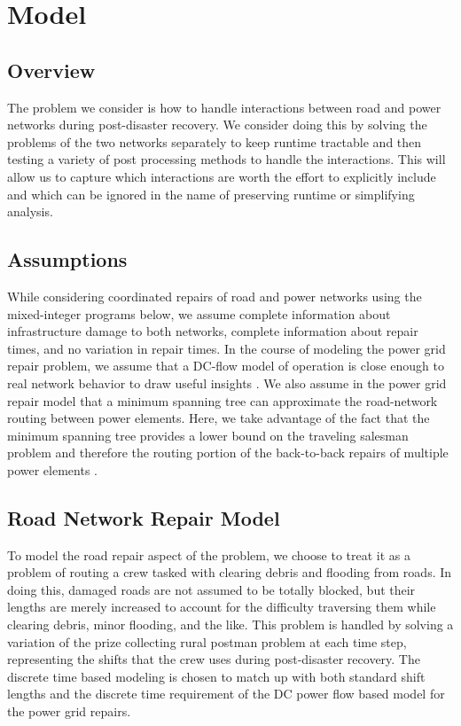 \documentclass[10pt]{article}
\newcounter{step}
\begin{document}
\section{\large{Model}}
\vspace*{-12pt}
\subsection{Overview}
The problem we consider is how to handle interactions between road and power networks during post-disaster recovery. We consider doing this by solving the problems of the two networks separately to keep runtime tractable and then testing a variety of post processing methods to handle the interactions. This will allow us to capture which interactions are worth the effort to explicitly include and which can be ignored in the name of preserving runtime or simplifying analysis. 
\subsection{Assumptions}
\vspace*{-12pt}
While considering coordinated repairs of road and power networks using the mixed-integer programs below, we assume complete information about infrastructure damage to both networks, complete information about repair times, and no variation in repair times. In the course of modeling the power grid repair problem, we assume that a DC-flow model of operation is close enough to real network behavior to draw useful insights \cite{QiEA2012}. We also assume in the power grid repair model that a minimum spanning tree can approximate the road-network routing between power elements. Here, we take advantage of the fact that the minimum spanning tree provides a lower bound on the traveling salesman problem and therefore the routing portion of the back-to-back repairs of multiple power elements .
\subsection{Road Network Repair Model}
\vspace*{-12pt}
To model the road repair aspect of the problem, we choose to treat it as a problem of routing a crew tasked with clearing debris and flooding from roads. In doing this, damaged roads are not assumed to be totally blocked, but their lengths are merely increased to account for the difficulty traversing them while clearing debris, minor flooding, and the like. This problem is handled by solving a variation of the prize collecting rural postman problem at each time step, representing the shifts that the crew uses during post-disaster recovery. The discrete time based modeling is chosen to match up with both standard shift lengths and the discrete time requirement of the DC power flow based model for the power grid repairs. 
\end{document}
